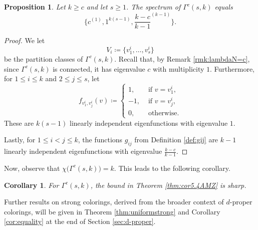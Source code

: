 \documentclass{article}
\theoremstyle{plain}
\newtheorem{proposition}[theorem]{Proposition}
\newtheorem{corollary}[theorem]{Corollary}
\theoremstyle{definition}
\theoremstyle{remark}
\begin{document}
\begin{proposition}\label{prop:spectrumcompmult}
    Let $k\geq c$ and let $s\geq1$. The spectrum of $\Gamma^c(s,k)$ equals
    \[
    \biggl\{ c^{(1)},1^{k(s-1)},\frac{k-c}{k-1}^{(k-1)}\biggl\}.
    \]
\end{proposition}
\begin{proof}
  We let $$V_i \coloneqq \bigl\{v_1^i,\ldots,v_s^i\bigr\}$$ be the partition classes of $\Gamma^c(s,k)$.
    Recall that, by Remark \ref{rmk:lambdaN=c}, since $\Gamma^c(s,k)$ is connected, it has eigenvalue $c$ with multiplicity $1$.
    Furthermore, for $1\leq i\leq k$ and $2\leq j\leq s$, let
  \[
    f_{v_1^i,v_j^i}(v)\coloneqq \begin{cases}
        1, &\text{ if } v = v_1^i,\\
        -1, &\text{ if } v = v_j^i,\\
        0, &\text{ otherwise.}
    \end{cases}
    \]
    These are $k(s-1)$ linearly independent eigenfunctions with eigenvalue $1$.
    
    Lastly, for $1\leq i<j\leq k$, the functions $g_{ij}$ from Definition \ref{def:gij} are $k-1$ linearly independent eigenfunctions with eigenvalue $\frac{k-c}{k-1}$.
\end{proof}
Now, observe that $\chi\biggl(\Gamma^c(s,k)\biggr) = k$. This leads to the following corollary.
\begin{corollary}
   For $\Gamma^c(s,k)$, the bound in Theorem \ref{thm:cor5.4AMZ} is sharp.
\end{corollary}



Further results on strong colorings, derived from the broader context of $d$-proper colorings, will be given in Theorem \ref{thm:uniformstrong} and Corollary \ref{cor:equality} at the end of Section \ref{sec:d-proper}.

\end{document}

